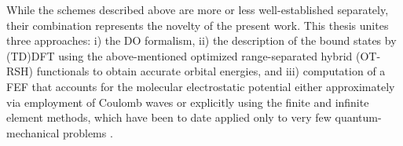 While the schemes described above are more or less well-established separately, their combination represents the novelty of the present work.
This thesis unites three approaches: i) the DO formalism, ii) the description of the bound states by (TD)DFT using the above-mentioned optimized range-separated hybrid (OT-RSH) functionals to obtain accurate orbital energies, and iii) computation of a FEF that accounts for the molecular electrostatic potential either approximately via employment of Coulomb waves or explicitly using the finite and infinite element methods, which have been to date applied only to very few quantum-mechanical problems \cite{sobaMolecule,bettessHarmonic}.

